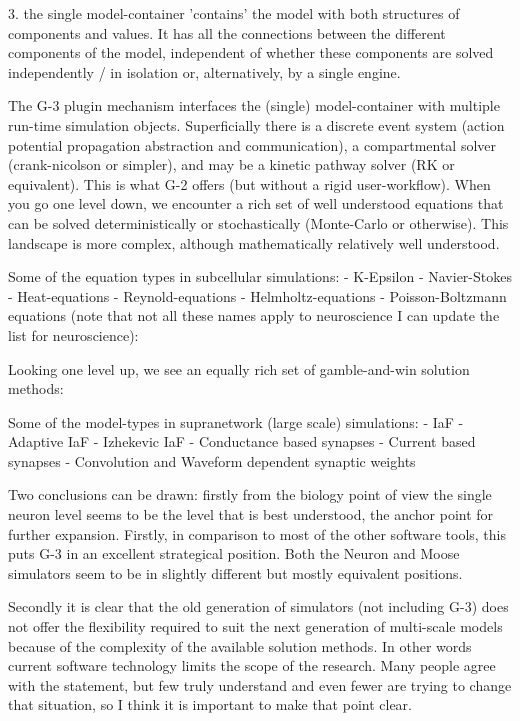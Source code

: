 \documentclass[12pt]{article}
\begin{document}
3. the single model-container 'contains' the model with both
structures of components and values.  It has all the connections
between the different components of the model, independent of whether
these components are solved independently / in isolation or,
alternatively, by a single engine.

The G-3 plugin mechanism interfaces the (single) model-container with
multiple run-time simulation objects.  Superficially there is a
discrete event system (action potential propagation abstraction and
communication), a compartmental solver (crank-nicolson or simpler),
and may be a kinetic pathway solver (RK or equivalent).  This is what
G-2 offers (but without a rigid user-workflow).  When you go one level
down, we encounter a rich set of well understood equations that can be
solved deterministically or stochastically (Monte-Carlo or otherwise).
 This landscape is more complex, although mathematically relatively
well understood.

Some of the equation types in subcellular simulations:
- K-Epsilon
- Navier-Stokes
- Heat-equations
- Reynold-equations
- Helmholtz-equations
- Poisson-Boltzmann equations
(note that not all these names apply to neuroscience I can update the
list for neuroscience):

Looking one level up, we see an equally rich set of gamble-and-win
solution methods:

Some of the model-types in supranetwork (large scale) simulations:
- IaF
- Adaptive IaF
- Izhekevic IaF
- Conductance based synapses
- Current based synapses
- Convolution and Waveform dependent synaptic weights

Two conclusions can be drawn: firstly from the biology point of view
the single neuron level seems to be the level that is best understood,
the anchor point for further expansion.  Firstly, in comparison to
most of the other software tools, this puts G-3 in an excellent
strategical position.  Both the Neuron and Moose simulators seem to be
in slightly different but mostly equivalent positions.

Secondly it is clear that the old generation of simulators (not
including G-3) does not offer the flexibility required to suit the
next generation of multi-scale models because of the complexity of the
available solution methods.  In other words current software
technology limits the scope of the research.  Many people agree with
the statement, but few truly understand and even fewer are trying to
change that situation, so I think it is important to make that point
clear.
\end{document}
